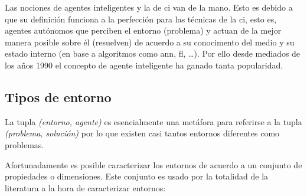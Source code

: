 Las nociones de agentes inteligentes y la de \ac{ci} van de la mano. Esto es debido a que su definición funciona a la perfección para las técnicas de la \ac{ci}, esto es, agentes autónomos que perciben el entorno (problema) y actuan de la mejor manera posible sobre él (resuelven) de acuerdo a su conocimento del medio y su estado interno (en base a algoritmos como \ac{ann}, \ac{fl}, \ldots). Por ello desde mediados de los años 1990 el concepto de agente inteligente ha ganado tanta popularidad.

\subsection{Tipos de entorno}

La tupla \textit{(entorno, agente)} es esencialmente una metáfora para referirse a la tupla \textit{(problema, solución)} por lo que existen casi tantos entornos diferentes como problemas.

Afortunadamente es posible caracterizar los entornos de acuerdo a un conjunto de propiedades o dimensiones. Este conjunto es usado por la totalidad de la literatura a la hora de caracterizar entornos:

